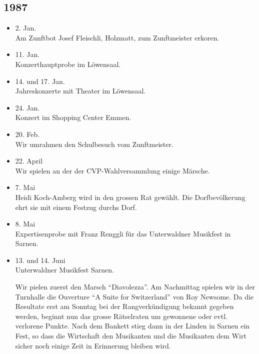 \subsection{1987}

\begin{history}


    \begin{itemize}

        \item 2. Jan.\\
              Am Zunftbot Josef Fleischli, Holzmatt, zum Zunftmeister erkoren.

        \item 11. Jan.\\
              Konzerthauptprobe im Löwensaal.

        \item 14. und 17. Jan.\\
              Jahreskonzerte mit Theater im Löwensaal.

        \item 24. Jan.\\
              Konzert im Shopping Center Emmen.

        \item 20. Feb.\\
              Wir umrahmen den Schulbesuch vom Zunftmeister.

        \item 22. April\\
              Wir spielen an der der CVP-Wahlversammlung einige Märsche.

        \item 7. Mai\\
              Heidi Koch-Amberg wird in den grossen Rat gewählt. Die Dorfbevölkerung
              ehrt sie mit einem Festzug durchs Dorf.

        \item 8. Mai\\
              Expertisenprobe mit Franz Renggli für das Unterwaldner Musikfest in
              Sarnen.

        \item 13. und 14. Juni\\
              Unterwaldner Musikfest Sarnen.

              Wir pielen zuerst den Marsch
              \enquote{Diavolezza}. Am Nachmittag spielen wir in der Turnhalle die
              Ouverture \enquote{A Suite for Switzerland} von Roy Newsome. Da die
              Resultate erst am Sonntag bei der Rangverkündigung bekannt gegeben
              werden, beginnt nun das grosse Rätselraten um gewonnene oder evtl.
              verlorene Punkte. Nach dem Bankett stieg dann in der Linden in Sarnen
              ein Fest, so dass die Wirtschaft den Musikanten und die Musikanten dem
              Wirt sicher noch einige Zeit in Erinnerung bleiben wird.


\end{itemize}
\end{history}
